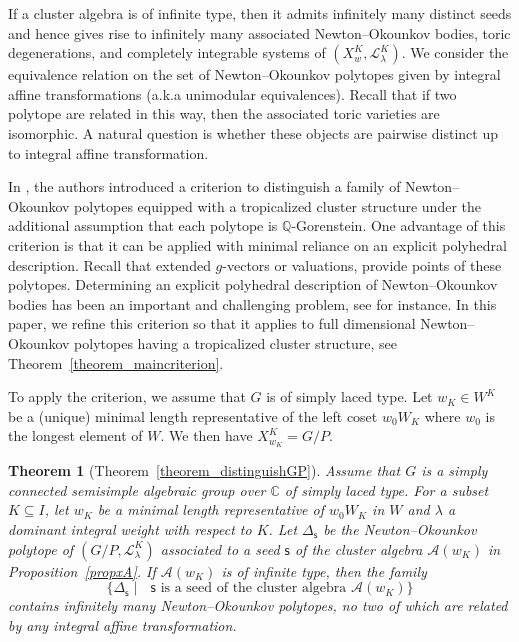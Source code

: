 \documentclass[11pt]{amsart}
\newcommand{\C}{\mathbb{C}}
\newcommand{\Q}{\mathbb{Q}}
\def\mcal{\mathcal}
\numberwithin{equation}{section}
\theoremstyle{plain}
\newtheorem{thmx}{Theorem}
\theoremstyle{definition}
\numberwithin{equation}{section}
\newcommand{\seed}{\mathsf{s}}
\begin{document}
If a cluster algebra is of infinite type, then it admits infinitely many distinct seeds and hence gives rise to infinitely many associated Newton--Okounkov bodies, toric degenerations, and completely integrable systems of $(X^K_w, \mathcal{L}^K_\lambda)$. We consider the equivalence relation on the set of Newton--Okounkov polytopes given by integral affine transformations (a.k.a unimodular equivalences). Recall that if two polytope are related in this way, then the associated toric varieties are isomorphic. A natural question is whether these objects are pairwise distinct up to integral affine transformation.

In \cite{CKKP25}, the authors introduced a criterion to distinguish a family of Newton--Okounkov polytopes equipped with a tropicalized cluster structure under the additional assumption that each polytope is $\Q$-Gorenstein. One advantage of this criterion is that it can be applied with minimal reliance on an explicit polyhedral description. Recall that extended $g$-vectors or valuations, provide points of these polytopes. Determining an explicit polyhedral description of Newton--Okounkov bodies has been an important and challenging problem, see \cite{BZ01, RW19} for instance. In this paper, we refine this criterion so that it applies to full dimensional Newton--Okounkov polytopes having a tropicalized cluster structure, see Theorem~\ref{theorem_maincriterion}.

To apply the criterion, we assume that $G$ is of simply laced type. Let $w_K \in W^K$ be a (unique) minimal length representative of the left coset $w_0 W_{K}$ where $w_0$ is the longest element of $W$. We then have $X^K_{w_K} = G/P$.

\begin{thmx}[Theorem~\ref{theorem_distinguishGP}]\label{thmxB}
Assume that $G$ is a simply connected semisimple algebraic group over $\C$ of simply laced type. For a subset $K \subseteq I$, let $w_K$ be a minimal length representative of $w_0 W_{K}$ in $W$ and $\lambda$ a dominant integral weight with respect to $K$. Let $\Delta_\seed$ be the Newton--Okounkov polytope of $(G/P, \mathcal{L}^K_\lambda)$ associated to a seed $\seed$ of the cluster algebra $\mathcal{A}(w_K)$ in Proposition~\ref{propxA}. If $\mcal{A}(w_K)$ is of infinite type, then the family 
$$
\bigl\{\Delta_\seed \mid \mbox{ $\seed$ is a seed of the cluster algebra $\mathcal{A}(w_K)$} \bigr\}
$$ 
contains infinitely many Newton--Okounkov polytopes, no two of which are related by any integral affine transformation.
\end{thmx}
\end{document}

